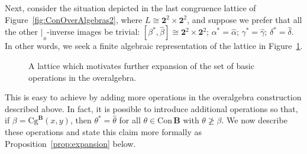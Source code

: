 \documentclass[cm,dissertation]{uhthesis}
\theoremstyle{plain}
\theoremstyle{definition}
\newcounter{claim}
\theoremstyle{remark}
\numberwithin{theorem}{section}
\numberwithin{claim}{chapter}
\numberwithin{equation}{section}
\numberwithin{conjecture}{chapter}
\newcommand{\<}{\ensuremath{\langle}}
\renewcommand{\>}{\ensuremath{\rangle}}
\renewcommand{\ngeq}{\ensuremath{\ngeqslant}}
\newcommand{\Cg}{\ensuremath{\mathrm{Cg}}}
\newcommand{\Con}{\ensuremath{\mathrm{Con\,}}}
\newcommand{\0}{\ensuremath{\mathbf{0}}}
\newcommand{\1}{\ensuremath{\mathbf{1}}}
\newcommand{\2}{\ensuremath{\mathbf{2}}}
\newcommand{\3}{\ensuremath{\mathbf{3}}}
\newcommand{\4}{\ensuremath{\mathbf{4}}}
\newcommand{\5}{\ensuremath{\mathbf{5}}}
\newcommand{\bB}{\ensuremath{\mathbf{B}}}
\newcommand{\resB}{\ensuremath{|_{_B}}}
\newcommand{\two}{\ensuremath{\mathbf{2}}}
\begin{document}
Next, consider the situation depicted in the last congruence lattice of
Figure~\ref{fig:ConOverAlgebras2}, where 
$L \cong \two^2\times\two^2$, and
suppose we prefer that all the other $\resB$-inverse images be trivial:
$
[\beta^*,\widehat{\beta}]\cong \two^2\times\two^2; \,%
\alpha^*=\widehat{\alpha}; \, %
\gamma^*=\widehat{\gamma};\,  %
\delta^*=\widehat{\delta}.
$
In other words, we seek a finite algebraic
representation of the lattice in Figure~\ref{fig:ConOverAlgebras3}.
\begin{figure}[h!]
  \centering
  \caption{A lattice which motivates further expansion of the set of basic 
    operations in the overalgebra.}
  \label{fig:ConOverAlgebras3}
\end{figure}
This is easy to achieve by adding more operations in the overalgebra
construction described above.
In fact, it is possible to introduce additional operations
so that, if $\beta = \Cg^\bB(x,y)$, then $\theta^* = \widehat{\theta}$ for all
$\theta \in \Con\bB$ with $\theta \ngeq \beta$.   We now describe these
operations and state this claim more formally as
Proposition~\ref{prop:expansion} below.
\end{document}
